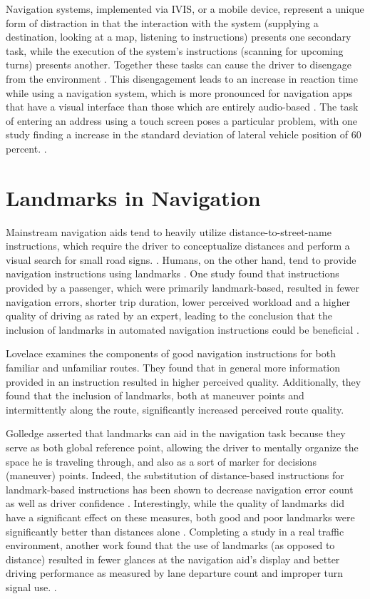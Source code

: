 Navigation systems, implemented via IVIS, or a mobile device, represent a unique form of distraction in that the interaction with the system (supplying a destination, looking at a map, listening to instructions) presents one secondary task, while the execution of the system's instructions (scanning for upcoming turns) presents another. Together these tasks can cause the driver to disengage from the environment \cite{leshed2008car}. This disengagement leads to an increase in reaction time while using a navigation system, which is more pronounced for navigation apps that have a visual interface than those which are entirely audio-based \cite{harms2003peripheral}. The task of entering an address using a touch screen poses a particular problem, with one study finding a increase in the standard deviation of lateral vehicle position of 60 percent. \cite{tsimhoni2004address}.

\section{Landmarks in Navigation}

Mainstream navigation aids tend to heavily utilize distance-to-street-name instructions, which require the driver to conceptualize distances and perform a visual search for small road signs. \cite{burnett2000turn}. Humans, on the other hand, tend to provide navigation instructions using landmarks \cite{zaidel1997automatic}. One study found that instructions provided by a passenger, which were primarily landmark-based, resulted in fewer navigation errors, shorter trip duration, lower perceived workload and a higher quality of driving as rated by an expert, leading to the conclusion that the inclusion of landmarks in automated navigation instructions could be beneficial \cite{burnett1997assessment}. 

Lovelace \cite{lovelace1999elements} examines the components of good navigation instructions for both familiar and unfamiliar routes.  They found that in general more information provided in an instruction resulted in higher perceived quality. Additionally, they found that the inclusion of landmarks, both at maneuver points and intermittently along the route, significantly increased perceived route quality.

Golledge \cite{golledge2003human} asserted that landmarks can aid in the navigation task because they serve as both global reference point, allowing the driver to mentally organize the space he is traveling through, and also as a sort of marker for decisions (maneuver) points. Indeed, the substitution of distance-based instructions for landmark-based instructions has been shown to decrease navigation error count as well as driver confidence \cite{may2005incorporating}. Interestingly, while the quality of landmarks did have a significant effect on these measures, both good and poor landmarks were significantly better than distances alone \cite{may2005incorporating}. Completing a study in a real traffic environment, another work found that the use of landmarks (as opposed to distance) resulted in fewer glances at the navigation aid's display and better driving performance as measured by lane departure count and improper turn signal use. \cite{may2006presence}.

